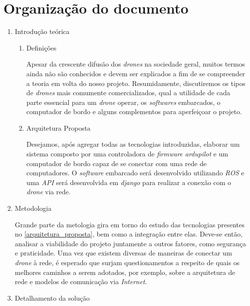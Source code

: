 \documentclass[12pt,a4paper,oneside]{book}
\begin{document}
\section{Organização do documento}

\begin{enumerate}
     \item Introdução teórica 
     
     \begin{enumerate}
     
         \item Definições
         
         Apesar da crescente difusão dos \textit{drones} na sociedade geral, muitos termos ainda não são conhecidos e devem ser explicados a fim de se compreender a teoria em volta do nosso projeto. Resumidamente, discutiremos os tipos de \textit{drones} mais comumente comercializados, qual a utilidade de cada parte essencial para um \textit{drone} operar,  os \textit{softwares} embarcados, o computador de bordo e alguns complementos para aperfeiçoar o projeto.
         
         \item Arquitetura Proposta \label{arquitetura_proposta}
 
         Desejamos, após agregar todas as tecnologias introduzidas, elaborar um sistema composto por uma controladora de \textit{firmware ardupilot} e um computador de bordo capaz de se conectar com uma rede de computadores. O \textit{software} embarcado será desenvolvido utilizando \textit{ROS} e uma \textit{API} será desenvolvida em \textit{django} para realizar a conexão com o \textit{drone} via rede.
 
     \end{enumerate}
     
     \item Metodologia

     Grande parte da metologia gira em torno do estudo das tecnologias presentes no \cref{arquitetura_proposta}, bem como a integração entre elas. Deve-se então, analisar a viabilidade do projeto juntamente a outros fatores, como segurança e praticidade.
     Uma vez que existem diversas de maneiras de conectar um \textit{drone} à rede, é esperado que surjam questionamentos a respeito de quais os melhores caminhos a serem adotados, por exemplo, sobre a arquitetura de rede e modelos de comunicação via \textit{Internet}.
 
     \item Detalhamento da solução \label{item:solucao}
     

\end{enumerate}
\end{document}
